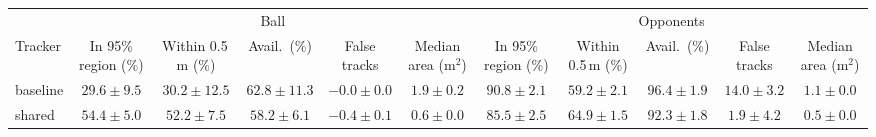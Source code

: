 \begin{tabular}{lcccccccccc}
\toprule
 & \multicolumn{5}{c}{Ball} & \multicolumn{5}{c}{Opponents} \\
\cmidrule(lr){2-6}\cmidrule(lr){7-11}
Tracker & In 95\% region (\%) & Within 0.5\,m (\%) & Avail.\ (\%) & False tracks & Median area (m$^2$) & In 95\% region (\%) & Within 0.5\,m (\%) & Avail.\ (\%) & False tracks & Median area (m$^2$) \\
\midrule
baseline & $29.6 \pm 9.5$ & $30.2 \pm 12.5$ & $62.8 \pm 11.3$ & $-0.0 \pm 0.0$ & $1.9 \pm 0.2$ & $90.8 \pm 2.1$ & $59.2 \pm 2.1$ & $96.4 \pm 1.9$ & $14.0 \pm 3.2$ & $1.1 \pm 0.0$ \\
shared & $54.4 \pm 5.0$ & $52.2 \pm 7.5$ & $58.2 \pm 6.1$ & $-0.4 \pm 0.1$ & $0.6 \pm 0.0$ & $85.5 \pm 2.5$ & $64.9 \pm 1.5$ & $92.3 \pm 1.8$ & $1.9 \pm 4.2$ & $0.5 \pm 0.0$ \\
\bottomrule
\end{tabular}
